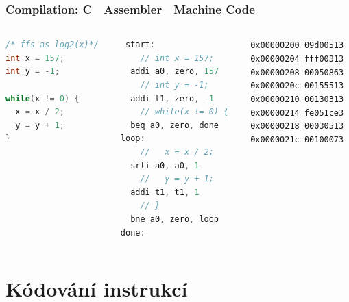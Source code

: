\documentclass{beamer}
\begin{document}
\begin{frame}[fragile,shrink=10]
\frametitle{Compilation: C  Assembler  Machine Code}

\begin{columns}
\begin{column}{0.3\textwidth}
\begin{lstlisting}[language={C},columns=flexible]
/* ffs as log2(x)*/
int x = 157;
int y = -1;
 
while(x != 0) {
  x = x / 2;
  y = y + 1;
}
\end{lstlisting}
\end{column}

\begin{column}{0.4\textwidth}  
\begin{lstlisting}[language={C},columns=flexible]
_start:
    // int x = 157;
  addi a0, zero, 157  
    // int y = -1;
  addi t1, zero, -1   
    // while(x != 0) {
  beq a0, zero, done  
loop:
    //   x = x / 2;
  srli a0, a0, 1 
    //   y = y + 1;
  addi t1, t1, 1      
    // }
  bne a0, zero, loop  
done:
\end{lstlisting}
\end{column}

\begin{column}{0.3\textwidth}  
\texttt{0x00000200  09d00513\\
0x00000204  fff00313\\
0x00000208  00050863\\
0x0000020c  00155513\\
0x00000210  00130313\\
0x00000214  fe051ce3\\
0x00000218  00030513\\
0x0000021c  00100073}
\end{column}

\end{columns}

\end{frame}

\section{Kódování instrukcí}
\end{document}
